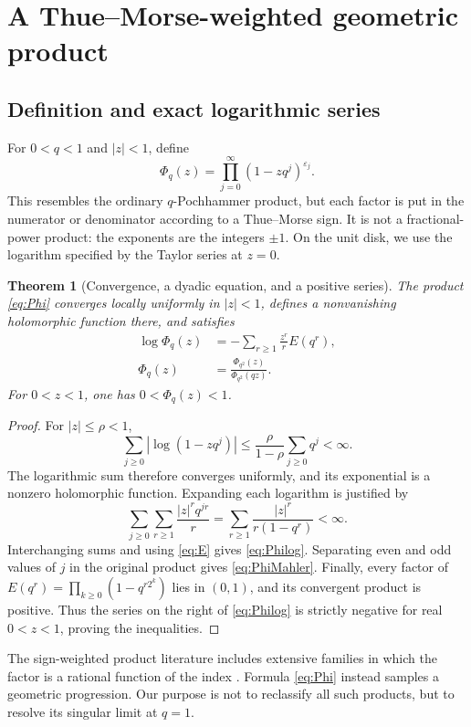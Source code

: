 \documentclass[11pt,oneside]{article}
\numberwithin{equation}{section}
\newtheorem{theorem}{Theorem}[section]
\theoremstyle{definition}
\theoremstyle{remark}
\newcommand{\eps}{\varepsilon}
\begin{document}
\section{A Thue--Morse-weighted geometric product}
\label{sec:qproduct}

\subsection{Definition and exact logarithmic series}
For \(0<q<1\) and \(|z|<1\), define
\begin{equation}
 \Phi_q(z)=\prod_{j=0}^{\infty}(1-zq^j)^{\eps_j}.
 \label{eq:Phi}
\end{equation}
This resembles the ordinary \(q\)-Pochhammer product, but each factor is put
in the numerator or denominator according to a Thue--Morse sign. It is not a
fractional-power product: the exponents are the integers \(\pm1\). On the unit
disk, we use the logarithm specified by the Taylor series at \(z=0\).

\begin{theorem}[Convergence, a dyadic equation, and a positive series]
\label{thm:Phi}
The product \eqref{eq:Phi} converges locally uniformly in \(|z|<1\), defines
a nonvanishing holomorphic function there, and satisfies
\begin{align}
 \log\Phi_q(z)&=-\sum_{r\ge1}\frac{z^r}{r}E(q^r),
 \label{eq:Philog}\\
 \Phi_q(z)&=\frac{\Phi_{q^2}(z)}{\Phi_{q^2}(qz)}.
 \label{eq:PhiMahler}
\end{align}
For \(0<z<1\), one has \(0<\Phi_q(z)<1\).
\end{theorem}
\begin{proof}
For \(|z|\le\rho<1\),
\[
 \sum_{j\ge0}|\log(1-zq^j)|
 \le\frac{\rho}{1-\rho}\sum_{j\ge0}q^j<\infty.
\]
The logarithmic sum therefore converges uniformly, and its exponential is a
nonzero holomorphic function. Expanding each logarithm is justified by
\[
 \sum_{j\ge0}\sum_{r\ge1}\frac{|z|^rq^{jr}}r
 =\sum_{r\ge1}\frac{|z|^r}{r(1-q^r)}<\infty.
\]
Interchanging sums and using \eqref{eq:E} gives \eqref{eq:Philog}.
Separating even and odd values of \(j\) in the original product gives
\eqref{eq:PhiMahler}. Finally, every factor of
\(E(q^r)=\prod_{k\ge0}(1-q^{r2^k})\) lies in \((0,1)\), and its convergent
product is positive. Thus the series on the right of \eqref{eq:Philog} is
strictly negative for real \(0<z<1\), proving the inequalities.
\end{proof}

The sign-weighted product literature includes extensive families in which the
factor is a rational function of the index \cite{ars,li}. Formula
\eqref{eq:Phi} instead samples a geometric progression. Our purpose is not to
reclassify all such products, but to resolve its singular limit at \(q=1\).
\end{document}
